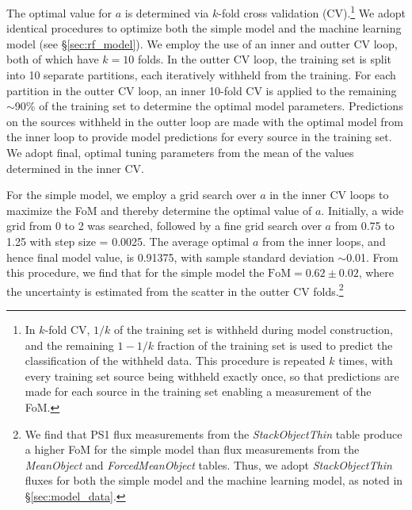 \documentclass[twocolumn, dvipdfmx]{aastex62}
\begin{document}
\begin{CJK*}{UTF8}{gbsn}
The optimal value for $a$ is determined via $k$-fold cross validation
(CV).\footnote{In $k$-fold CV, $1/k$ of the training set is withheld during
model construction, and the remaining $1-1/k$ fraction of the training set is
used to predict the classification of the withheld data. This
procedure is repeated $k$ times, with every training set source
being withheld exactly once, so that predictions are made for each source in
the training set enabling a measurement of the FoM.} We adopt identical
procedures to optimize both the simple model and the machine learning model
(see \S\ref{sec:rf_model}). We employ the use of an inner and outter CV
loop, both of which have $k = 10$ folds. In the outter CV loop, the training
set is split into 10 separate partitions, each iteratively withheld from the
training. For each partition in the outter CV loop, an inner 10-fold CV is
applied to the remaining $\sim$90\% of the training set to determine the
optimal model parameters. Predictions on the sources withheld in the outter
loop are made with the optimal model from the inner loop to provide model
predictions for every source in the training set. We adopt final, optimal
tuning parameters from the mean of the values determined in the inner CV.

For the simple model, we employ a grid search over $a$ in the inner CV loops
to maximize the FoM and thereby determine the optimal value of $a$.
Initially, a wide grid from 0 to 2 was searched, followed by a fine grid
search over $a$ from 0.75 to 1.25 with step size = 0.0025. The average
optimal $a$ from the inner loops, and hence final model value, is 0.91375,
with sample standard deviation $\sim$0.01. From this procedure, we find that
for the simple model the $\mathrm{FoM} = 0.62 \pm 0.02$, where the
uncertainty is estimated from the scatter in the outter CV
folds.\footnote{We find that PS1 flux measurements from the
\textit{StackObjectThin} table produce a higher FoM for the simple model
than flux measurements from the \textit{MeanObject} and
\textit{ForcedMeanObject} tables. Thus, we adopt \textit{StackObjectThin}
fluxes for both the simple model and the machine learning model, as noted in
\S\ref{sec:model_data}.}



\end{CJK*}
\end{document}
